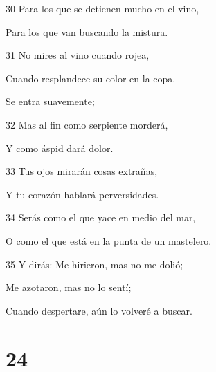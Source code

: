 \par 30 Para los que se detienen mucho en el vino,
\par Para los que van buscando la mistura.
\par 31 No mires al vino cuando rojea,
\par Cuando resplandece su color en la copa.
\par Se entra suavemente;
\par 32 Mas al fin como serpiente morderá,
\par Y como áspid dará dolor.
\par 33 Tus ojos mirarán cosas extrañas,
\par Y tu corazón hablará perversidades.
\par 34 Serás como el que yace en medio del mar,
\par O como el que está en la punta de un mastelero.
\par 35 Y dirás: Me hirieron, mas no me dolió;
\par Me azotaron, mas no lo sentí;
\par Cuando despertare, aún lo volveré a buscar.

\chapter{24}

